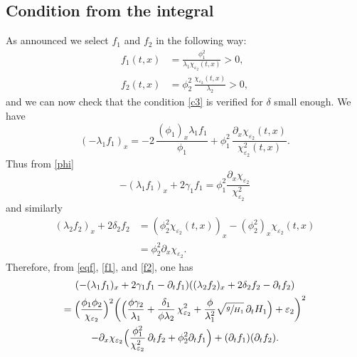 \subsection{Condition from the integral}
{As announced we} select $f_{1}$ and $f_{2}$ in the following way:
\begin{equation}
\begin{split}
f_{1}(t,x)&=\frac{\phi^{2}_{1}}{\lambda_{1}\chi_{\varepsilon_{2}}(t,x)}>0,\\
f_{2}(t,x)&=\phi_{2}^{2}\,\frac{\chi_{\varepsilon_{2}}(t,x)}{\lambda_{2}}>0,
\label{deff1f2}
\end{split}
\end{equation}
and we can now check that the condition \eqref{c3} is verified for $\delta$ small enough. {We have}
\begin{equation*}
(-\lambda_{1}f_{1})_{x}=-2\,\frac{(\phi_{1})_{x}\lambda_{1}f_{1}}{\phi_{1}}+\phi_{1}^{2}\,\frac{\partial_{x}\chi_{\varepsilon_{2}}(t,x)}{\chi_{\varepsilon_{2}}^{2}(t,x)}.
\end{equation*}
Thus from \eqref{phi}
\begin{equation}
-(\lambda_{1}f_{1})_{x}+2\gamma_{1}f_{1}
=\phi_{1}^{2}\frac{\partial_{x}\chi_{\varepsilon_{2}}}{\chi^{2}_{\varepsilon_{2}}}
\label{f1}
\end{equation}
and similarly
\begin{equation}
\begin{split}
(\lambda_{2}f_{2})_{x}+2\delta_{2}f_{2}&=(\phi^{2}_{2}\chi_{\varepsilon_{2}}(t,x))_{x}-(\phi^{2}_{2})_{x}\chi_{\varepsilon_{2}}(t,x)\\
&=\phi_{2}^{2}\partial_{x}\chi_{\varepsilon_{2}}.
\end{split}
\label{f2}
\end{equation}
Therefore, from \eqref{eqf}, \eqref{f1}, and \eqref{f2}, one has
\begin{multline}
\label{cond00}
(-(\lambda_{1}f_{1})_{x}+2\gamma_{1}f_{1}-\partial_{t}f_{1})((\lambda_{2}f_{2})_{x}+2\delta_{2}f_{2}-\partial_{t}f_{2})\\
=\Bigl(\frac{\phi_{1}\phi_{2}}{\chi_{\varepsilon_{2}}} \Bigr)^{2}\biggl(\Bigl(\frac{\phi \gamma_{2}}{\lambda_{1}}+\frac{\delta_{1}}{\phi\lambda_{2}}\,\chi_{\varepsilon_{2}}^{2}+{\frac{\phi}{\lambda_{1}^{2}}}\sqrt{\sfrac{g}{H_{1}}}\,\partial_{t} H_{1} \Bigr)
+\varepsilon_{2} \biggr)^{2}\\
-\partial_{x}\chi_{\varepsilon_{2}} \Bigl(\frac{\phi_{1}^{2}}{\chi^{2}_{\varepsilon_{2}}}\,\partial_{t}f_{2}
+\phi_{2}^{2}\partial_{t}f_{1} \Bigr)
+(\partial_{t}f_{1})(\partial_{t}f_{2}).
\end{multline}
